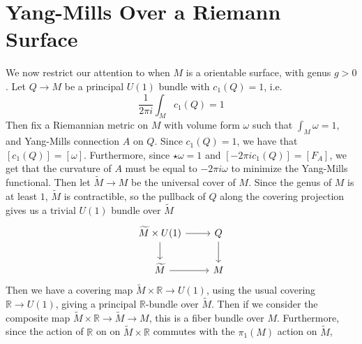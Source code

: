 \documentclass[psamsfonts, 12pt]{amsart}
\theoremstyle{definition}
\theoremstyle{remark}
\newcommand{\R}{\mathbb{R}}
\newcommand{\C}{\mathbb{C}}
\newcommand{\dbar}{\overline{\partial}}
\newcommand{\g}{\mathfrak{g}}
\newcommand{\defeq}{\vcentcolon=}
\DeclareMathOperator{\id}{id}
\begin{document}
\section{Yang-Mills Over a Riemann Surface}
%
\iffalse
The Hodge star operator maps $\Omega^1_M \to \Omega^1_M$, and satisfies
$\star^2 = -\id$, which induces an almost complex structure on $M$, giving us a
decomposition $\Omega^1_M(\C) = \Omega^{1,0}_M(\C) \oplus \Omega^{0,1}_M(\C)$
into the $\pm i$ eigenspaces of the complexified Hodge star. The operator
$\dbar \defeq \pi^{0,1} \circ d$ (where $\pi^{0,1}$ denotes projection onto
$\Omega^{0,1}_M(\C)$) satisfies $\dbar^2 = 0$ since by dimension reasons,
$\Omega^{0,2}_M(\C) = 0$, so the induced almost complex structure is integrable by the
Newlander-Nirenberg theorem. The same argument with projection onto $\Omega^{1,0}_M(\C)$
gives an operator $\partial$ satisfying $\partial^2 = 0$, and we get a decomposition
$d = \partial + \dbar$. Then given a principal bundle $P \to M$, We get a similar
decomposition for $\Omega^1_M(\g_P)$ after complexification giving a decomposition
$d_A = \partial_A + \dbar_A$ for any connection $A \in \mathscr{A}(P)$.
\fi
We now restrict our attention to when $M$ is a orientable surface, with genus $g > 0$.
Let $Q \to M$ be a principal $U(1)$ bundle with $c_1(Q) = 1$, i.e.
\[
\frac{1}{2\pi i} \int_M c_1(Q) = 1
\]
Then fix a Riemannian metric on $M$ with volume form $\omega$ such that
$\int_M \omega = 1$, and Yang-Mills connection $A$ on $Q$. Since $c_1(Q) = 1$, we have
that $[c_1(Q)] = [\omega]$. Furthermore, since $\star\omega = 1$ and
$[-2\pi i c_1(Q)] = [F_A]$, we get that the curvature of $A$ must be equal to
$-2\pi i \omega$ to minimize the Yang-Mills functional. Then let $\widetilde{M} \to M$
be the universal cover of $M$. Since the genus of $M$ is at least $1$, $\widetilde{M}$
is contractible, so the pullback of $Q$ along the covering projection gives us a
trivial $U(1)$ bundle over $\widetilde{M}$
\[\begin{tikzcd}
\widetilde{M} \times U(1)\ar[d] \ar[r] & Q \ar[d]\\
\widetilde{M} \ar[r] & M
\end{tikzcd}\]
%
Then we have a covering map $\widetilde{M} \times \R \to U(1)$, using the usual
covering $\R \to U(1)$, giving a principal $\R$-bundle over $\widetilde{M}$. Then
if we consider the composite map $\widetilde{M} \times \R \to \widetilde{M} \to M$,
this is a fiber bundle over $M$. Furthermore, since the action of $\R$
on on $\widetilde{M} \times \R$ commutes with the $\pi_1(M)$ action on $\widetilde{M}$,
\end{document}
